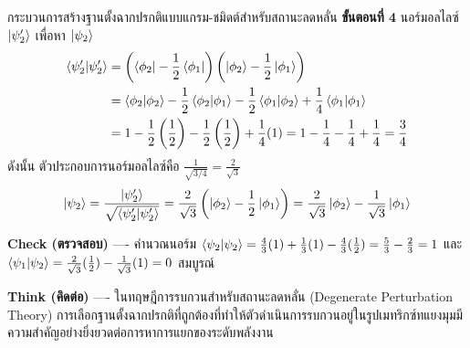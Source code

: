 \begin{psctbox}{กระบวนการสร้างฐานตั้งฉากปรกติแบบแกรม-ชมิดต์สำหรับสถานะลดหลั่น}
\textbf{ขั้นตอนที่ 4} นอร์มอลไลซ์ $\ket{\psi_2'}$ เพื่อหา $\ket{\psi_2}$
\begin{align*}
\braket{\psi_2'}{\psi_2'} &= \left( \bra{\phi_2} - \frac{1}{2}\bra{\phi_1} \right) \left( \ket{\phi_2} - \frac{1}{2}\ket{\phi_1} \right) \\
&= \braket{\phi_2}{\phi_2} - \frac{1}{2}\braket{\phi_2}{\phi_1} - \frac{1}{2}\braket{\phi_1}{\phi_2} + \frac{1}{4}\braket{\phi_1}{\phi_1} \\
&= 1 - \frac{1}{2}\left(\frac{1}{2}\right) - \frac{1}{2}\left(\frac{1}{2}\right) + \frac{1}{4}(1) = 1 - \frac{1}{4} - \frac{1}{4} + \frac{1}{4} = \frac{3}{4}
\end{align*}
ดังนั้น ตัวประกอบการนอร์มอลไลซ์คือ $\frac{1}{\sqrt{3/4}} = \frac{2}{\sqrt{3}}$
\begin{equation*}
\ket{\psi_2} = \frac{\ket{\psi_2'}}{\sqrt{\braket{\psi_2'}{\psi_2'}}} = \frac{2}{\sqrt{3}}\left( \ket{\phi_2} - \frac{1}{2}\ket{\phi_1} \right) = \frac{2}{\sqrt{3}}\ket{\phi_2} - \frac{1}{\sqrt{3}}\ket{\phi_1}
\end{equation*}

\textbf{Check (ตรวจสอบ)} ---- คำนวณนอร์ม $\braket{\psi_2}{\psi_2} = \frac{4}{3}(1) + \frac{1}{3}(1) - \frac{4}{3}(\frac{1}{2}) = \frac{5}{3} - \frac{2}{3} = 1$ และ $\braket{\psi_1}{\psi_2} = \frac{2}{\sqrt{3}}(\frac{1}{2}) - \frac{1}{\sqrt{3}}(1) = 0$ สมบูรณ์

\textbf{Think (คิดต่อ)} ---- ในทฤษฎีการรบกวนสำหรับสถานะลดหลั่น (Degenerate Perturbation Theory) การเลือกฐานตั้งฉากปรกติที่ถูกต้องที่ทำให้ตัวดำเนินการรบกวนอยู่ในรูปเมทริกซ์ทแยงมุมมีความสำคัญอย่างยิ่งยวดต่อการหาการแยกของระดับพลังงาน
\end{psctbox}

